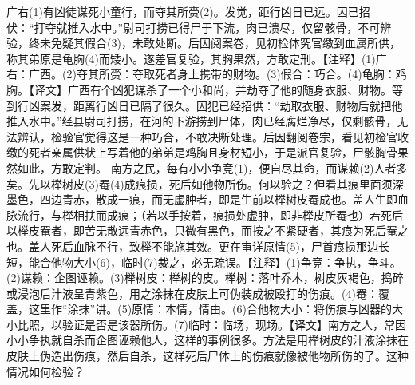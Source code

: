 \documentclass[12pt,UTF8]{ctexbook}
\begin{document}
广右(1)有凶徒谋死小童行，而夺其所赍(2)。发觉，距行凶日已远。囚已招伏：“打夺就推入水中。”尉司打捞已得尸于下流，肉已溃尽，仅留骸骨，不可辨验，终未免疑其假合(3)，未敢处断。后因阅案卷，见初检体究官缴到血属所供，称其弟原是龟胸(4)而矮小。遂差官复验，其胸果然，方敢定刑。【注释】(1)广右：广西。(2)夺其所赍：夺取死者身上携带的财物。(3)假合：巧合。(4)龟胸：鸡胸。【译文】广西有个凶犯谋杀了一个小和尚，并劫夺了他的随身衣服、财物。等到行凶案发，距离行凶日已隔了很久。囚犯已经招供：“劫取衣服、财物后就把他推入水中。”经县尉司打捞，在河的下游捞到尸体，肉已经腐烂净尽，仅剩骸骨，无法辨认，检验官觉得这是一种巧合，不敢决断处理。后因翻阅卷宗，看见初检官收缴的死者亲属供状上写着他的弟弟是鸡胸且身材短小，于是派官复验，尸骸胸骨果然如此，方敢定判。
南方之民，每有小小争竞(1)，便自尽其命，而谋赖(2)人者多矣。先以榉树皮(3)罨(4)成痕损，死后如他物所伤。何以验之？但看其痕里面须深墨色，四边青赤，散成一痕，而无虚肿者，即是生前以榉树皮罨成也。盖人生即血脉流行，与榉相扶而成痕；（若以手按着，痕损处虚肿，即非榉皮所罨也）若死后以榉皮罨者，即苦无散远青赤色，只微有黑色，而按之不紧硬者，其痕为死后罨之也。盖人死后血脉不行，致榉不能施其效。更在审详原情(5)，尸首痕损那边长短，能合他物大小(6)，临时(7)裁之，必无疏误。【注释】(1)争竞：争执，争斗。(2)谋赖：企图诬赖。(3)榉树皮：榉树的皮。榉树：落叶乔木，树皮灰褐色，捣碎或浸泡后汁液呈青紫色，用之涂抹在皮肤上可伪装成被殴打的伤痕。(4)罨：覆盖，这里作“涂抹”讲。(5)原情：本情，情由。(6)合他物大小：将伤痕与凶器的大小比照，以验证是否是该器所伤。(7)临时：临场，现场。【译文】南方之人，常因小小争执就自杀而企图诬赖他人，这样的事例很多。方法是用榉树皮的汁液涂抹在皮肤上伪造出伤痕，然后自杀，这样死后尸体上的伤痕就像被他物所伤的了。这种情况如何检验？
\end{document}
